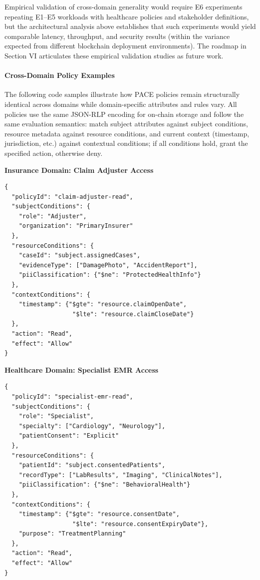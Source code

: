 \documentclass[pdflatex,sn-mathphys-num]{sn-jnl}
\begin{document}
Empirical validation of cross-domain generality would require E6 experiments repeating E1--E5 workloads with healthcare policies and stakeholder definitions, but the architectural analysis above establishes that such experiments would yield comparable latency, throughput, and security results (within the variance expected from different blockchain deployment environments). The roadmap in Section VI articulates these empirical validation studies as future work.

\paragraph{Cross-Domain Policy Examples}

The following code samples illustrate how PACE policies remain structurally identical across domains while domain-specific attributes and rules vary. All policies use the same JSON-RLP encoding for on-chain storage and follow the same evaluation semantics: match subject attributes against subject conditions, resource metadata against resource conditions, and current context (timestamp, jurisdiction, etc.) against contextual conditions; if all conditions hold, grant the specified action, otherwise deny.

\textbf{Insurance Domain: Claim Adjuster Access}
\begin{lstlisting}[frame=none, numbers=none]
{
  "policyId": "claim-adjuster-read",
  "subjectConditions": {
    "role": "Adjuster",
    "organization": "PrimaryInsurer"
  },
  "resourceConditions": {
    "caseId": "subject.assignedCases",
    "evidenceType": ["DamagePhoto", "AccidentReport"],
    "piiClassification": {"$ne": "ProtectedHealthInfo"}
  },
  "contextConditions": {
    "timestamp": {"$gte": "resource.claimOpenDate",
                   "$lte": "resource.claimCloseDate"}
  },
  "action": "Read",
  "effect": "Allow"
}
\end{lstlisting}

\textbf{Healthcare Domain: Specialist EMR Access}
\begin{lstlisting}[frame=none, numbers=none]
{
  "policyId": "specialist-emr-read",
  "subjectConditions": {
    "role": "Specialist",
    "specialty": ["Cardiology", "Neurology"],
    "patientConsent": "Explicit"
  },
  "resourceConditions": {
    "patientId": "subject.consentedPatients",
    "recordType": ["LabResults", "Imaging", "ClinicalNotes"],
    "piiClassification": {"$ne": "BehavioralHealth"}
  },
  "contextConditions": {
    "timestamp": {"$gte": "resource.consentDate",
                   "$lte": "resource.consentExpiryDate"},
    "purpose": "TreatmentPlanning"
  },
  "action": "Read",
  "effect": "Allow"
}
\end{lstlisting}
\end{document}
